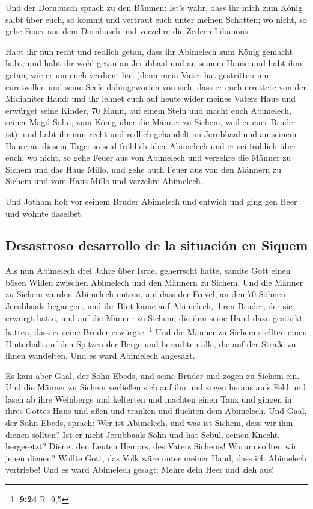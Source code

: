  Und der Dornbusch sprach zu den Bäumen: Ist's wahr, dass
ihr mich zum König salbt über euch, so kommt und vertraut euch unter
meinen Schatten; wo nicht, so gehe Feuer aus dem Dornbusch und verzehre
die Zedern Libanons.

 Habt ihr nun recht und redlich getan, dass ihr Abimelech
zum König gemacht habt; und habt ihr wohl getan an Jerubbaal und an
seinem Hause und habt ihm getan, wie er um euch verdient hat
 (denn mein Vater hat gestritten um euretwillen und seine
Seele dahingeworfen von sich, dass er euch errettete von der Midianiter
Hand;  und ihr lehnet euch auf heute wider meines Vaters
Haus und erwürget seine Kinder, 70 Mann, auf einem Stein und macht euch
Abimelech, seiner Magd Sohn, zum König über die Männer zu Sichem, weil
er euer Bruder ist);  und habt ihr nun recht und redlich
gehandelt an Jerubbaal und an seinem Hause an diesem Tage: so seid
fröhlich über Abimelech und er sei fröhlich über euch; 
wo nicht, so gehe Feuer aus von Abimelech und verzehre die Männer zu
Sichem und das Haus Millo, und gehe auch Feuer aus von den Männern zu
Sichem und vom Haus Millo und verzehre Abimelech.

 Und Jotham floh vor seinem Bruder Abimelech und entwich
und ging gen Beer und wohnte daselbst.

\hypertarget{desastroso-desarrollo-de-la-situaciuxf3n-en-siquem}{%
\subsection{Desastroso desarrollo de la situación en
Siquem}\label{desastroso-desarrollo-de-la-situaciuxf3n-en-siquem}}

 Als nun Abimelech drei Jahre über Israel geherrscht
hatte,  sandte Gott einen bösen Willen zwischen Abimelech
und den Männern zu Sichem. Und die Männer zu Sichem wurden Abimelech
untreu,  auf dass der Frevel, an den 70 Söhnen Jerubbaals
begangen, und ihr Blut käme auf Abimelech, ihren Bruder, der sie erwürgt
hatte, und auf die Männer zu Sichem, die ihm seine Hand dazu gestärkt
hatten, dass er seine Brüder erwürgte. \footnote{\textbf{9:24} Ri 9,5}
 Und die Männer zu Sichem stellten einen Hinterhalt auf
den Spitzen der Berge und beraubten alle, die auf der Straße zu ihnen
wandelten. Und es ward Abimelech angesagt.

 Es kam aber Gaal, der Sohn Ebeds, und seine Brüder und
zogen zu Sichem ein. Und die Männer zu Sichem verließen sich auf ihn
 und zogen heraus aufs Feld und lasen ab ihre Weinberge
und kelterten und machten einen Tanz und gingen in ihres Gottes Haus und
aßen und tranken und fluchten dem Abimelech.  Und Gaal,
der Sohn Ebeds, sprach: Wer ist Abimelech, und was ist Sichem, dass wir
ihm dienen sollten? Ist er nicht Jerubbaals Sohn und hat Sebul, seinen
Knecht, hergesetzt? Dienet den Leuten Hemors, des Vaters Sichems! Warum
sollten wir jenen dienen?  Wollte Gott, das Volk wäre
unter meiner Hand, dass ich Abimelech vertriebe! Und es ward Abimelech
gesagt: Mehre dein Heer und zieh aus!

